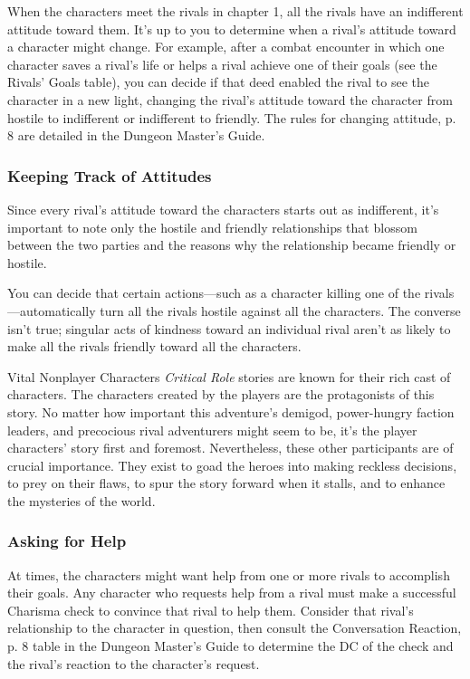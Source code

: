 \documentclass[letterpaper, 11pt, bg=full, twocolumn]{dndbook}
\begin{document}
When the characters meet the rivals in chapter 1, all the rivals have an indifferent attitude toward them. It's up to you to determine when a rival's attitude toward a character might change. For example, after a combat encounter in which one character saves a rival's life or helps a rival achieve one of their goals (see the Rivals' Goals table), you can decide if that deed enabled the rival to see the character in a new light, changing the rival's attitude toward the character from hostile to indifferent or indifferent to friendly. The rules for changing attitude, p. 8 are detailed in the Dungeon Master's Guide.

\subsubsection{Keeping Track of Attitudes}

Since every rival's attitude toward the characters starts out as indifferent, it's important to note only the hostile and friendly relationships that blossom between the two parties and the reasons why the relationship became friendly or hostile.

You can decide that certain actions---such as a character killing one of the rivals---automatically turn all the rivals hostile against all the characters. The converse isn't true; singular acts of kindness toward an individual rival aren't as likely to make all the rivals friendly toward all the characters.

\begin{DndSidebar}{Vital Nonplayer Characters}
\textit{Critical Role} stories are known for their rich cast of characters. The characters created by the players are the protagonists of this story. No matter how important this adventure's demigod, power-hungry faction leaders, and precocious rival adventurers might seem to be, it's the player characters' story first and foremost.
Nevertheless, these other participants are of crucial importance. They exist to goad the heroes into making reckless decisions, to prey on their flaws, to spur the story forward when it stalls, and to enhance the mysteries of the world.
\end{DndSidebar}

\subsubsection{Asking for Help}

At times, the characters might want help from one or more rivals to accomplish their goals. Any character who requests help from a rival must make a successful Charisma check to convince that rival to help them. Consider that rival's relationship to the character in question, then consult the Conversation Reaction, p. 8 table in the Dungeon Master's Guide to determine the DC of the check and the rival's reaction to the character's request.
\end{document}
